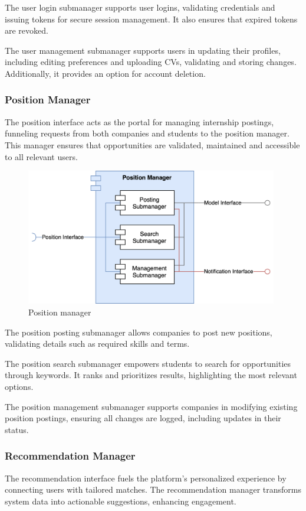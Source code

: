 The user login submanager supports user logins, validating credentials and issuing tokens for secure session management.
It also ensures that expired tokens are revoked.

The user management submanager supports users in updating their profiles, including editing preferences and uploading CVs, validating and storing changes.
Additionally, it provides an option for account deletion.

\subsubsection{Position Manager}
The position interface acts as the portal for managing internship postings, funneling requests from both companies and students to the position manager.
This manager ensures that opportunities are validated, maintained and accessible to all relevant users.

\begin{figure}[h]
    \centering
    \includegraphics[width=11cm]{images/managers/position.png}
    \caption{Position manager}
\end{figure}

The position posting submanager allows companies to post new positions, validating details such as required skills and terms.

The position search submanager empowers students to search for opportunities through keywords.
It ranks and prioritizes results, highlighting the most relevant options.

The position management submanager supports companies in modifying existing position postings, ensuring all changes are logged, including updates in their status.

\subsubsection{Recommendation Manager}
The recommendation interface fuels the platform’s personalized experience by connecting users with tailored matches.
The recommendation manager transforms system data into actionable suggestions, enhancing engagement.

